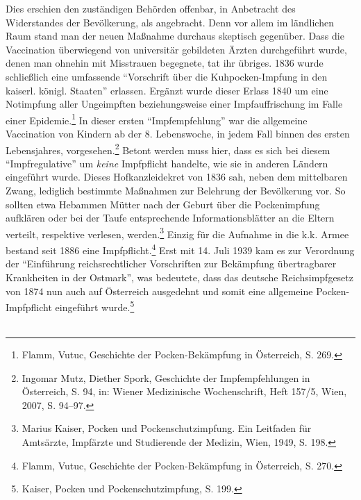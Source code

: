 \documentclass[
    a4paper,
    12pt,
    hyphens,
    chapterprefix=true,
    headheight=33pt,
    footheight=29pt,
    headings=optiontohead,
]{scrartcl}
\begin{document}
Dies erschien den zuständigen Behörden offenbar, in Anbetracht des Widerstandes der Bevölkerung, als angebracht. Denn vor allem im ländlichen Raum stand man der neuen Maßnahme durchaus skeptisch gegenüber. Dass die Vaccination überwiegend von universitär gebildeten Ärzten durchgeführt wurde, denen man ohnehin mit Misstrauen begegnete, tat ihr übriges. 1836 wurde schließlich eine umfassende "`Vorschrift über die Kuhpocken-Impfung in den kaiserl. königl. Staaten"' erlassen. Ergänzt wurde dieser Erlass 1840 um eine Notimpfung aller Ungeimpften beziehungsweise einer Impfauffrischung im Falle einer Epidemie.\footnote{Flamm, Vutuc, Geschichte der Pocken-Bekämpfung in Österreich, S. 269.} In dieser ersten "`Impfempfehlung"' war die allgemeine Vaccination von Kindern ab der 8. Lebenswoche, in jedem Fall binnen des ersten Lebensjahres, vorgesehen.\footnote{Ingomar Mutz, Diether Spork, Geschichte der Impfempfehlungen in Österreich, S. 94, in: Wiener Medizinische Wochenschrift, Heft 157/5, Wien, 2007, S. 94--97.} Betont werden muss hier, dass es sich bei diesem "`Impfregulative"' um \textit{keine} Impfpflicht handelte, wie sie in anderen Ländern eingeführt wurde. Dieses Hofkanzleidekret von 1836 sah, neben dem mittelbaren Zwang, lediglich bestimmte Maßnahmen zur Belehrung der Bevölkerung vor. So sollten etwa Hebammen Mütter nach der Geburt über die Pockenimpfung aufklären oder bei der Taufe entsprechende Informationsblätter an die Eltern verteilt, respektive verlesen, werden.\footnote{Marius Kaiser, Pocken und Pockenschutzimpfung. Ein Leitfaden für Amtsärzte, Impfärzte und Studierende der Medizin, Wien, 1949, S. 198.} Einzig für die Aufnahme in die k.k. Armee bestand seit 1886 eine Impfpflicht.\footnote{Flamm, Vutuc, Geschichte der Pocken-Bekämpfung in Österreich, S. 270.} Erst mit 14. Juli 1939 kam es zur Verordnung der "`Einführung reichsrechtlicher Vorschriften zur Bekämpfung übertragbarer Krankheiten in der Ostmark"', was bedeutete, dass das deutsche Reichsimpfgesetz von 1874 nun auch auf Österreich ausgedehnt und somit eine allgemeine Pocken-Impfpflicht eingeführt wurde.\footnote{Kaiser, Pocken und Pockenschutzimpfung, S. 199.}\\
\\
\end{document}
